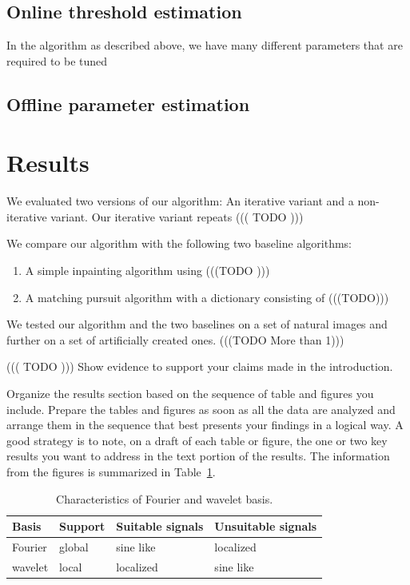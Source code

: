 \documentclass[10pt,conference,compsocconf]{IEEEtran}
\begin{document}
\subsection{Online threshold estimation}
In the algorithm as described above, we have many different parameters that are required to be tuned

\subsection{Offline parameter estimation}


\section{Results}
We evaluated two versions of our algorithm: An iterative variant and a non-iterative variant.
Our iterative variant repeats 
 ((( TODO )))
 
 We compare our algorithm with the following two baseline algorithms:
 \begin{enumerate}
 \item A simple inpainting algorithm using (((TODO )))
 \item A matching pursuit algorithm with a dictionary consisting of (((TODO)))
 \end{enumerate}
 
 We tested our algorithm and the two baselines on a set of natural images and further on a set of artificially created ones. (((TODO More than 1))) 
 
 ((( TODO )))
  Show evidence to support your claims made in the
  introduction. 
  
Organize the results section based on the sequence of table and
figures you include. Prepare the tables and figures as soon as all
the data are analyzed and arrange them in the sequence that best
presents your findings in a logical way. A good strategy is to note,
on a draft of each table or figure, the one or two key results you
want to address in the text portion of the results.
The information from the figures is
summarized in Table~\ref{tab:fourier-wavelet}.

\begin{table}[htbp]
  \centering
  \begin{tabular}[c]{|l||l|l|l|}
    \hline
    Basis&Support&Suitable signals&Unsuitable signals\\
    \hline
    Fourier&global&sine like&localized\\
    wavelet&local&localized&sine like\\
    \hline
  \end{tabular}
  \caption{Characteristics of Fourier and wavelet basis.}
  \label{tab:fourier-wavelet}
\end{table}
\end{document}
